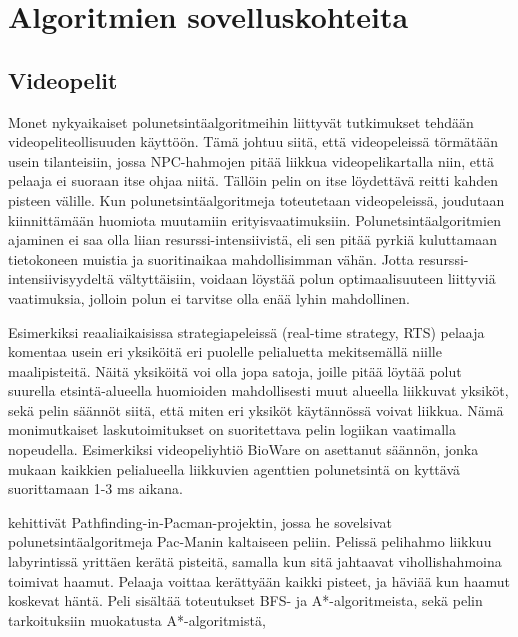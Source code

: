 \chapter{Algoritmien sovelluskohteita} \label{algoritmienSovelluskohteita}

\section{Videopelit}\label{videopelit}
Monet nykyaikaiset polunetsintäalgoritmeihin liittyvät tutkimukset tehdään 
videopeliteollisuuden 
käyttöön.\cite{MathewAndMalathy}\cite{ACMHindawi}\cite{mazeGameTrilogi} 
Tämä johtuu siitä, että videopeleissä törmätään usein tilanteisiin, jossa 
NPC-hahmojen pitää liikkua videopelikartalla niin, että pelaaja ei suoraan 
itse ohjaa niitä. Tällöin pelin on itse löydettävä reitti kahden pisteen 
välille. Kun polunetsintäalgoritmeja toteutetaan videopeleissä, joudutaan 
kiinnittämään huomiota muutamiin erityisvaatimuksiin. Polunetsintäalgoritmien 
ajaminen ei saa olla liian resurssi-intensiivistä, eli sen pitää pyrkiä 
kuluttamaan tietokoneen muistia ja suoritinaikaa mahdollisimman vähän. Jotta 
resurssi-intensiivisyydeltä vältyttäisiin, voidaan löystää polun 
optimaalisuuteen liittyviä vaatimuksia, jolloin polun ei tarvitse olla enää 
lyhin mahdollinen.\cite{MathewAndMalathy} \par
	Esimerkiksi reaaliaikaisissa strategiapeleissä (real-time strategy, 
RTS) pelaaja komentaa usein eri yksiköitä eri puolelle pelialuetta 
mekitsemällä niille maalipisteitä. Näitä yksiköitä voi olla jopa satoja, 
joille pitää löytää polut suurella etsintä-alueella huomioiden mahdollisesti 
muut alueella liikkuvat yksiköt, sekä pelin säännöt siitä, että miten eri 
yksiköt käytännössä voivat liikkua.\cite{pPacman}\cite{MathewAndMalathy} 
Nämä monimutkaiset laskutoimitukset on suoritettava pelin logiikan 
vaatimalla nopeudella. Esimerkiksi videopeliyhtiö BioWare on asettanut 
säännön, jonka mukaan kaikkien pelialueella liikkuvien agenttien polunetsintä 
on kyttävä suorittamaan 1-3 ms aikana.\cite{pPacman} \par
	\textcite{pPacman} kehittivät Pathfinding-in-Pacman-projektin, jossa 
he sovelsivat polunetsintäalgoritmeja Pac-Manin kaltaiseen peliin. Pelissä 
pelihahmo liikkuu labyrintissä yrittäen kerätä pisteitä, samalla kun sitä 
jahtaavat vihollishahmoina toimivat haamut. Pelaaja voittaa kerättyään kaikki 
pisteet, ja häviää kun haamut koskevat häntä. Peli sisältää toteutukset BFS- 
ja A*-algoritmeista, sekä pelin tarkoituksiin muokatusta A*-algoritmistä, 
